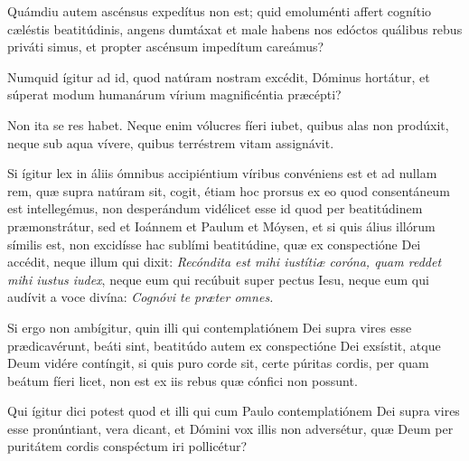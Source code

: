 {\noindent Quámdiu autem ascénsus expedítus non est; quid emoluménti affert cognítio cæléstis beatitúdinis, angens dumtáxat et male habens nos edóctos quálibus rebus priváti simus, et propter ascénsum impedítum careámus?

\noindent Numquid ígitur ad id, quod natúram nostram excédit, Dóminus hortátur, et súperat modum humanárum vírium magnificéntia præcépti?

\noindent Non ita se res habet. Neque enim vólucres fíeri iubet, quibus alas non prodúxit, neque sub aqua vívere, quibus terréstrem vitam assignávit.

\noindent Si ígitur lex in áliis ómnibus accipiéntium víribus convéniens est et ad nullam rem, quæ supra natúram sit, cogit, étiam hoc prorsus ex eo quod consentáneum est intellegémus, non desperándum vidélicet esse id quod per beatitúdinem præmonstrátur, sed et Ioánnem et Paulum et Móysen, et si quis álius illórum símilis est, non excidísse hac sublími beatitúdine, quæ ex conspectióne Dei accédit, neque illum qui dixit: \emph{Recóndita est mihi iustítiæ coróna, quam reddet mihi iustus iudex}, neque eum qui recúbuit super pectus Iesu, neque eum qui audívit a voce divína: \emph{Cognóvi te præter omnes.}

\noindent Si ergo non ambígitur, quin illi qui contemplatiónem Dei supra vires esse prædicavérunt, beáti sint, beatitúdo autem ex conspectióne Dei exsístit, atque Deum vidére contíngit, si quis puro corde sit, certe púritas cordis, per quam beátum fíeri licet, non est ex iis rebus quæ cónfici non possunt.

\noindent Qui ígitur dici potest quod et illi qui cum Paulo contemplatiónem Dei supra vires esse pronúntiant, vera dicant, et Dómini vox illis non adversétur, quæ Deum per puritátem cordis conspéctum iri pollicétur?}
\newcommand{\responsoriumiii}{\pars{Responsorium 3.} \scriptura{\Rbardot{} Eccli. 24, 8-11 \Vbardot{} ibid. 24, 7; \textbf{H399}}

\vspace{-5mm}

\responsorium{VI}{temporalia/resp-gyrumcaeli-CROCHU-cumdox.gtex}{}}


